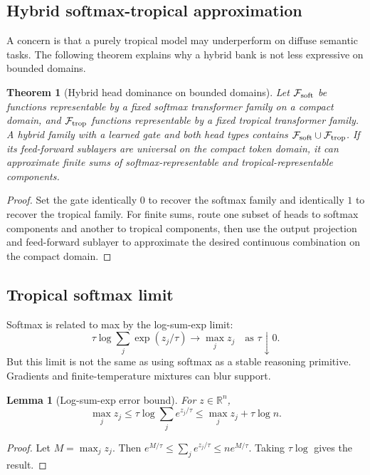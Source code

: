 \documentclass[11pt]{article}
\newtheorem{theorem}[definition]{Theorem}
\newtheorem{lemma}[definition]{Lemma}
\newcommand{\R}{\mathbb{R}}
\newcommand{\calF}{\mathcal{F}}
\begin{document}
\subsection{Hybrid softmax-tropical approximation}

A concern is that a purely tropical model may underperform on diffuse semantic tasks.  The following theorem explains why a hybrid bank is not less expressive on bounded domains.

\begin{theorem}[Hybrid head dominance on bounded domains]
Let \(\calF_{\rm soft}\) be functions representable by a fixed softmax transformer family on a compact domain, and \(\calF_{\rm trop}\) functions representable by a fixed tropical transformer family.  A hybrid family with a learned gate and both head types contains \(\calF_{\rm soft}\cup\calF_{\rm trop}\).  If its feed-forward sublayers are universal on the compact token domain, it can approximate finite sums of softmax-representable and tropical-representable components.
\end{theorem}
\begin{proof}
Set the gate identically \(0\) to recover the softmax family and identically \(1\) to recover the tropical family.  For finite sums, route one subset of heads to softmax components and another to tropical components, then use the output projection and feed-forward sublayer to approximate the desired continuous combination on the compact domain.
\end{proof}

\subsection{Tropical softmax limit}

Softmax is related to max by the log-sum-exp limit:
\begin{equation}
\tau\log\sum_j \exp(z_j/\tau)\to\max_j z_j\quad\text{as }\tau\downarrow0.
\end{equation}
But this limit is not the same as using softmax as a stable reasoning primitive.  Gradients and finite-temperature mixtures can blur support.

\begin{lemma}[Log-sum-exp error bound]
For \(z\in\R^n\),
\begin{equation}
\max_j z_j\le \tau\log\sum_j e^{z_j/\tau}\le \max_j z_j+\tau\log n.
\end{equation}
\end{lemma}
\begin{proof}
Let \(M=\max_j z_j\).  Then \(e^{M/\tau}\le\sum_j e^{z_j/\tau}\le n e^{M/\tau}\).  Taking \(\tau\log\) gives the result.
\end{proof}
\end{document}
